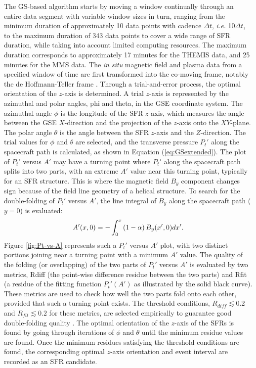 The GS-based algorithm starts by moving a window continually through an entire data segment with variable window sizes in turn, ranging from the minimum duration of approximately 10 data points with cadence $\Delta t$, \textit{i.e.} 10$\Delta t$, to the maximum duration of 343 data points to cover a wide range of SFR duration, while taking into account limited computing resources. The maximum duration corresponds to approximately 17 minutes for the THEMIS data, and 25 minutes for the MMS data. The \textit{in situ} magnetic field and plasma data from a specified window of time are first transformed into the co-moving frame, notably the de Hoffmann-Teller frame \citep{deHoffman-Teller:1950}. Through a trial-and-error process, the optimal orientation of the $z$-axis is determined. A trial $z$-axis is represented by the azimuthal and polar angles, \gls{phi} and \gls{theta}, in the GSE coordinate system. The azimuthal angle $\phi$ is the longitude of the SFR $z$-axis, which measures the angle between the GSE $X$-direction and the projection of the $z$-axis onto the $XY$-plane. The polar angle $\theta$ is the angle between the SFR $z$-axis and the $Z$-direction. The trial values for $\phi$ and $\theta$ are selected, and the transverse pressure $P_t'$ along the spacecraft path is calculated, as shown in Equation (\ref{eq:GSextended}). The plot of $P_t'$ versus $A'$ may have a turning point where $P_t'$ along the spacecraft path splits into two parts, with an extreme $A'$ value near this turning point, typically for an SFR structure. This is where the magnetic field $B_y$ component changes sign because of the field line geometry of a helical structure. To search for the double-folding of $P_t'$ versus $A'$, the line integral of $B_y$ along the spacecraft path ($y=0$) is evaluated:
\begin{equation}
    A'(x,0)=-\int_0^x\left( 1-\alpha \right)B_y(x',0)dx'.
    \label{eq:By-integral}
\end{equation}
Figure \ref{fig:Pt-vs-A} represents such a $P_t'$ versus $A'$ plot, with two distinct portions joining near a turning point with a minimum $A'$ value. The quality of the folding (or overlapping) of the two parts of $P_t'$ versus $A'$ is evaluated by two metrics, \gls{Rdiff} (the point-wise difference residue between the two parts) and \gls{Rfit} (a residue of the fitting function $P_t'(A')$ as illustrated by the solid black curve). These metrics are used to check how well the two parts fold onto each other, provided that such a turning point exists. The threshold conditions, $R_{diff}\lesssim 0.2$ and $R_{fit}\lesssim 0.2$ for these metrics, are selected empirically to guarantee good double-folding quality \citep{Hu:2018}. The optimal orientation of the $z$-axis of the SFRs is found by going through iterations of $\phi$ and $\theta$ until the minimum residue values are found. Once the minimum residues satisfying the threshold conditions are found, the corresponding optimal $z$-axis orientation and event interval are recorded as an SFR candidate.


